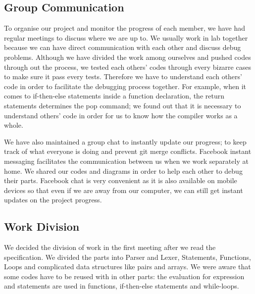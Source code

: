 \documentclass[a4paper]{article}
\theoremstyle{definition}
\begin{document}
\subsection{Group Communication}
To organise our project and monitor the progress of each member, we have had regular meetings to discuss where we are up to. We usually work in lab together because we can have direct communication with each other and discuss debug problems. Although we have divided the work among ourselves and pushed codes through out the process, we tested each others' codes through every bizarre cases to make sure it pass every tests. Therefore we have to understand each others' code in order to facilitate the debugging process together. For example, when it comes to if-then-else statements inside a function declaration, the return statements determines the pop command; we found out that it is necessary to understand others' code in order for us to know how the compiler works as a whole.

We have also maintained a group chat to instantly update our progress; to keep track of what everyone is doing and prevent git merge conflicts. Facebook instant messaging facilitates the communication between us when we work separately at home. We shared our codes and diagrams in order to help each other to debug their parts. Facebook chat is very convenient as it is also available on mobile devices so that even if we are away from our computer, we can still get instant updates on the project progress.


\subsection{Work Division}
We decided the division of work in the first meeting after we read the specification. We divided the parts into Parser and Lexer, Statements, Functions, Loops and complicated data structures like pairs and arrays. We were aware that some codes have to be reused with in other parts: the evaluation for expression and statements are used in functions, if-then-else statements and while-loops.
\end{document}
